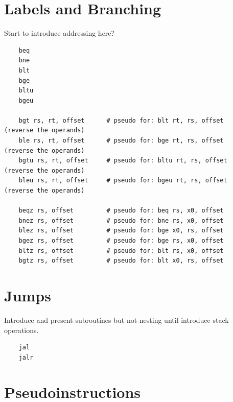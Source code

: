 \section{Labels and Branching}

Start to introduce addressing here?

\label{uguide:beq}
\label{uguide:bne}
\label{uguide:blt}
\label{uguide:bge}
\label{uguide:bltu}
\label{uguide:bgeu}
\label{uguide:bgt}
\label{uguide:ble}
\label{uguide:bgtu}
\label{uguide:beqz}
\label{uguide:bnez}
\label{uguide:blez}
\label{uguide:bgez}
\label{uguide:bltz}
\label{uguide:bgtz}
{\small
\begin{verbatim}
    beq
    bne
    blt
    bge
    bltu
    bgeu

    bgt rs, rt, offset      # pseudo for: blt rt, rs, offset    (reverse the operands)
    ble rs, rt, offset      # pseudo for: bge rt, rs, offset    (reverse the operands)
    bgtu rs, rt, offset     # pseudo for: bltu rt, rs, offset   (reverse the operands)
    bleu rs, rt, offset     # pseudo for: bgeu rt, rs, offset   (reverse the operands)

    beqz rs, offset         # pseudo for: beq rs, x0, offset
    bnez rs, offset         # pseudo for: bne rs, x0, offset
    blez rs, offset         # pseudo for: bge x0, rs, offset
    bgez rs, offset         # pseudo for: bge rs, x0, offset
    bltz rs, offset         # pseudo for: blt rs, x0, offset
    bgtz rs, offset         # pseudo for: blt x0, rs, offset
\end{verbatim}
}



\section{Jumps}

Introduce and present subroutines but not nesting until introduce stack operations.

\label{uguide:jal}
\label{uguide:jalr}
{\small
\begin{verbatim}
    jal
    jalr
\end{verbatim}
}



\section{Pseudoinstructions}

